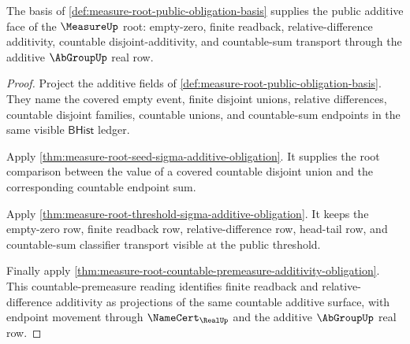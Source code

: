 \begin{theorem}
\label{thm:measure-root-public-obligation-basis-additivity}
The basis of \autoref{def:measure-root-public-obligation-basis} supplies the
public additive face of the $\MeasureUp$ root: empty-zero, finite readback,
relative-difference additivity, countable disjoint-additivity, and
countable-sum transport through the additive $\AbGroupUp$ real row.
\end{theorem}
\begin{proof}
Project the additive fields of
\autoref{def:measure-root-public-obligation-basis}. They name the covered
empty event, finite disjoint unions, relative differences, countable
disjoint families, countable unions, and countable-sum endpoints in the same
visible $\mathsf{BHist}$ ledger.

Apply \autoref{thm:measure-root-seed-sigma-additive-obligation}. It supplies
the root comparison between the value of a covered countable disjoint union
and the corresponding countable endpoint sum.

Apply \autoref{thm:measure-root-threshold-sigma-additive-obligation}. It
keeps the empty-zero row, finite readback row, relative-difference row,
head-tail row, and countable-sum classifier transport visible at the public
threshold.

Finally apply
\autoref{thm:measure-root-countable-premeasure-additivity-obligation}. This
countable-premeasure reading identifies finite readback and
relative-difference additivity as projections of the same countable additive
surface, with endpoint movement through $\NameCert_{\RealUp}$ and the
additive $\AbGroupUp$ real row.
\end{proof}

